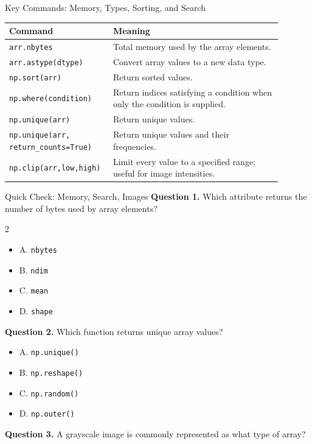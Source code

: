 \documentclass[aspectratio=169,11pt]{beamer}
\newcommand{\quiztitle}[1]{\textbf{\textcolor{QuizOrange}{#1}}}
\begin{document}
\begin{frame}{Key Commands: Memory, Types, Sorting, and Search}
\scriptsize
\begin{tabular}{p{0.30\linewidth}p{0.59\linewidth}}
\toprule
\textbf{Command} & \textbf{Meaning} \\
\midrule
\texttt{arr.nbytes} & Total memory used by the array elements. \\
\texttt{arr.astype(dtype)} & Convert array values to a new data type. \\
\texttt{np.sort(arr)} & Return sorted values. \\
\texttt{np.where(condition)} & Return indices satisfying a condition when only the condition is supplied. \\
\texttt{np.unique(arr)} & Return unique values. \\
\texttt{np.unique(arr, return\_counts=True)} & Return unique values and their frequencies. \\
\texttt{np.clip(arr,low,high)} & Limit every value to a specified range; useful for image intensities. \\
\bottomrule
\end{tabular}
\end{frame}

\begin{frame}{Quick Check: Memory, Search, Images}
\small
\quiztitle{Question 1.} Which attribute returns the number of bytes used by array elements?
\begin{multicols}{2}
\begin{itemize}
  \item A. \texttt{nbytes}
  \item B. \texttt{ndim}
  \item C. \texttt{mean}
  \item D. \texttt{shape}
\end{itemize}
\end{multicols}
\quiztitle{Question 2.} Which function returns unique array values?
\begin{itemize}
  \item A. \texttt{np.unique()}
  \item B. \texttt{np.reshape()}
  \item C. \texttt{np.random()}
  \item D. \texttt{np.outer()}
\end{itemize}
\quiztitle{Question 3.} A grayscale image is commonly represented as what type of array?
\end{frame}
\end{document}
